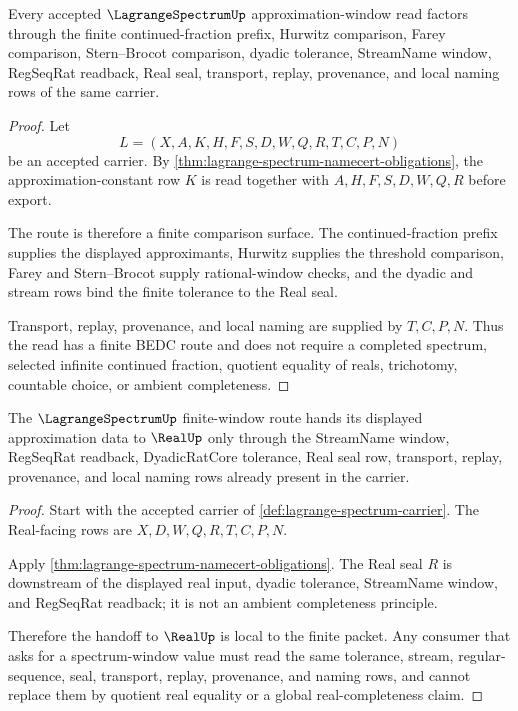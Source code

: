 \begin{theorem}
\label{thm:lagrange-spectrum-finite-approximation-route}
Every accepted $\LagrangeSpectrumUp$ approximation-window read factors through the finite continued-fraction prefix, Hurwitz comparison, Farey comparison, Stern--Brocot comparison, dyadic tolerance, StreamName window, RegSeqRat readback, Real seal, transport, replay, provenance, and local naming rows of the same carrier.
\end{theorem}
\begin{proof}
Let
$$
L=(X,A,K,H,F,S,D,W,Q,R,T,C,P,N)
$$
be an accepted carrier. By \autoref{thm:lagrange-spectrum-namecert-obligations}, the approximation-constant row $K$ is read together with $A,H,F,S,D,W,Q,R$ before export.

The route is therefore a finite comparison surface. The continued-fraction prefix supplies the displayed approximants, Hurwitz supplies the threshold comparison, Farey and Stern--Brocot supply rational-window checks, and the dyadic and stream rows bind the finite tolerance to the Real seal.

Transport, replay, provenance, and local naming are supplied by $T,C,P,N$. Thus the read has a finite BEDC route and does not require a completed spectrum, selected infinite continued fraction, quotient equality of reals, trichotomy, countable choice, or ambient completeness.
\end{proof}

\begin{theorem}
\label{thm:lagrange-spectrum-real-seal-handoff}
The $\LagrangeSpectrumUp$ finite-window route hands its displayed approximation data to $\RealUp$ only through the StreamName window, RegSeqRat readback, DyadicRatCore tolerance, Real seal row, transport, replay, provenance, and local naming rows already present in the carrier.
\end{theorem}
\begin{proof}
Start with the accepted carrier of \autoref{def:lagrange-spectrum-carrier}. The Real-facing rows are $X,D,W,Q,R,T,C,P,N$.

Apply \autoref{thm:lagrange-spectrum-namecert-obligations}. The Real seal $R$ is downstream of the displayed real input, dyadic tolerance, StreamName window, and RegSeqRat readback; it is not an ambient completeness principle.

Therefore the handoff to $\RealUp$ is local to the finite packet. Any consumer that asks for a spectrum-window value must read the same tolerance, stream, regular-sequence, seal, transport, replay, provenance, and naming rows, and cannot replace them by quotient real equality or a global real-completeness claim.
\end{proof}

